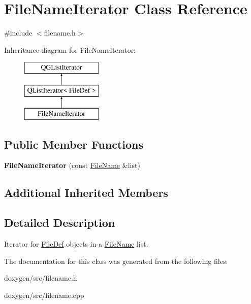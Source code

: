 \hypertarget{class_file_name_iterator}{}\section{File\+Name\+Iterator Class Reference}
\label{class_file_name_iterator}


{\ttfamily \#include $<$filename.\+h$>$}

Inheritance diagram for File\+Name\+Iterator\+:\begin{figure}[H]
\begin{center}
\leavevmode
\includegraphics[height=3.000000cm]{class_file_name_iterator}
\end{center}
\end{figure}
\subsection*{Public Member Functions}
\begin{DoxyCompactItemize}
\item 
\mbox{\label{class_file_name_iterator_ad5446536a5cc810a17d0305ec2f7d477}} 
{\bfseries File\+Name\+Iterator} (const \mbox{\hyperlink{class_file_name}{File\+Name}} \&list)
\end{DoxyCompactItemize}
\subsection*{Additional Inherited Members}


\subsection{Detailed Description}
Iterator for \mbox{\hyperlink{class_file_def}{File\+Def}} objects in a \mbox{\hyperlink{class_file_name}{File\+Name}} list. 

The documentation for this class was generated from the following files\+:\begin{DoxyCompactItemize}
\item 
doxygen/src/filename.\+h\item 
doxygen/src/filename.\+cpp\end{DoxyCompactItemize}
